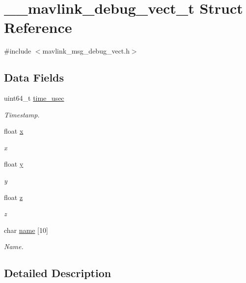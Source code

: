 \hypertarget{struct____mavlink__debug__vect__t}{\section{\-\_\-\-\_\-mavlink\-\_\-debug\-\_\-vect\-\_\-t Struct Reference}
\label{struct____mavlink__debug__vect__t}
}


{\ttfamily \#include $<$mavlink\-\_\-msg\-\_\-debug\-\_\-vect.\-h$>$}

\subsection*{Data Fields}
\begin{DoxyCompactItemize}
\item 
uint64\-\_\-t \hyperlink{struct____mavlink__debug__vect__t_a8ce7a8e6e061bff40d49ca81fdd3ce33}{time\-\_\-usec}
\begin{DoxyCompactList}\small\item\em Timestamp. \end{DoxyCompactList}\item 
float \hyperlink{struct____mavlink__debug__vect__t_a9a222c84369ea74593be0625abb29bc8}{x}
\begin{DoxyCompactList}\small\item\em x \end{DoxyCompactList}\item 
float \hyperlink{struct____mavlink__debug__vect__t_a400c1d51e5edb6686737999ae6e4aba7}{y}
\begin{DoxyCompactList}\small\item\em y \end{DoxyCompactList}\item 
float \hyperlink{struct____mavlink__debug__vect__t_a8fdd83fc7a64d6a8200dea9dddf58ee9}{z}
\begin{DoxyCompactList}\small\item\em z \end{DoxyCompactList}\item 
char \hyperlink{struct____mavlink__debug__vect__t_a8547179b8e8db0e26704d23b474d5f0a}{name} \mbox{[}10\mbox{]}
\begin{DoxyCompactList}\small\item\em Name. \end{DoxyCompactList}\end{DoxyCompactItemize}


\subsection{Detailed Description}



